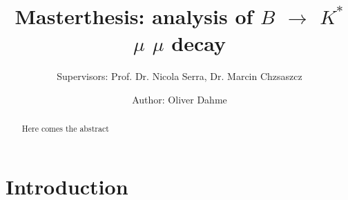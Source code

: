 \documentclass[english]{uzhpub}
\begin{document}
\title{Masterthesis: analysis of $B$ $\rightarrow$ $K^{*}$ $\mu$ $\mu$ decay}

\subtitle{Supervisors: Prof. Dr. Nicola Serra, Dr. Marcin Chzsaszcz}

\author{Author: Oliver Dahme}


\maketitle




\begin{abstract}
  Here comes the abstract
\end{abstract}


\section{Introduction}
\end{document}
